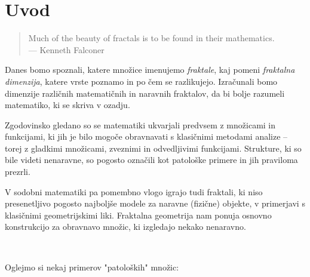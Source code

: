 \section{Uvod}

\begin{quote}
    Much of the beauty of fractals is to be found in their mathematics.\\
\hfill --- Kenneth Falconer
\end{quote}

Danes bomo spoznali, katere množice imenujemo \emph{fraktale}, kaj pomeni \emph{fraktalna dimenzija}, katere vrste poznamo in po čem se razlikujejo. Izračunali bomo dimenzije različnih matematičnih in naravnih fraktalov, da bi bolje razumeli matematiko, ki se skriva v ozadju.

Zgodovinsko gledano so se matematiki ukvarjali predvsem z množicami in funkcijami, ki jih je bilo mogoče obravnavati s klasičnimi metodami analize -- torej z gladkimi množicami, zveznimi in odvedljivimi funkcijami. Strukture, ki so bile videti nenaravne, so pogosto označili kot patološke primere in jih praviloma prezrli.

V sodobni matematiki pa pomembno vlogo igrajo tudi fraktali, ki niso presenetljivo pogosto najboljše modele za naravne (fizične) objekte, v primerjavi s klasičnimi geometrijskimi liki. Fraktalna geometrija nam ponuja osnovno konstrukcijo za obravnavo množic, ki izgledajo nekako nenaravno.

\ 

Oglejmo si nekaj primerov "patoloških" množic:

